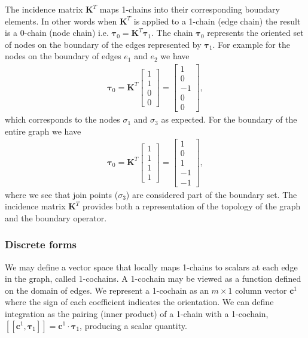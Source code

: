 The incidence matrix $\mathbf{K}^T$ maps 1-chains into their corresponding boundary elements. In other words when $\mathbf{K}^T$ is applied to a 1-chain (edge chain) the result is a 0-chain (node chain) i.e. $\mathbf{\tau}_0 = \mathbf{K}^T \mathbf{\tau}_1$. The chain $\mathbf{\tau}_0$ represents the oriented set of nodes on the boundary of the edges represented by $\mathbf{\tau}_1$. For example for the nodes on the boundary of edges $e_1$ and $e_2$ we have
\begin{align*}
\mathbf{\tau}_0 = \mathbf{K}^T \begin{bmatrix}
1 \\ 1 \\ 0 \\ 0
\end{bmatrix} = \begin{bmatrix}
1 \\ 0 \\ -1 \\ 0 \\ 0
\end{bmatrix},
\end{align*}
which corresponds to the nodes $\sigma_1$ and $\sigma_3$ as expected. For the boundary of the entire graph we have 
\begin{align*}
\mathbf{\tau}_0 = \mathbf{K}^T \begin{bmatrix}
1 \\ 1 \\ 1 \\ 1
\end{bmatrix} = \begin{bmatrix}
1 \\ 0 \\ 1 \\ -1 \\ -1
\end{bmatrix},
\end{align*}
where we see that join points ($\sigma_3$) are considered part of the boundary set. The incidence matrix $\mathbf{K}^T$ provides both a representation of the topology of the graph and the boundary operator. 

\subsubsection{Discrete forms}

We may define a vector space that locally maps 1-chains to scalars at each edge in the graph, called 1-cochains. A 1-cochain may be viewed as a function defined on the domain of edges. We represent a 1-cochain as an $m \times 1$ column vector $\mathbf{c}^1$ where the sign of each coefficient indicates the orientation. We can define integration as the pairing (inner product) of a 1-chain with a 1-cochain,
$[\![ \mathbf{c}^1, \mathbf{\tau}_1 ]\!] = \mathbf{c}^1 \cdot \mathbf{\tau}_1$, producing a scalar quantity. 

